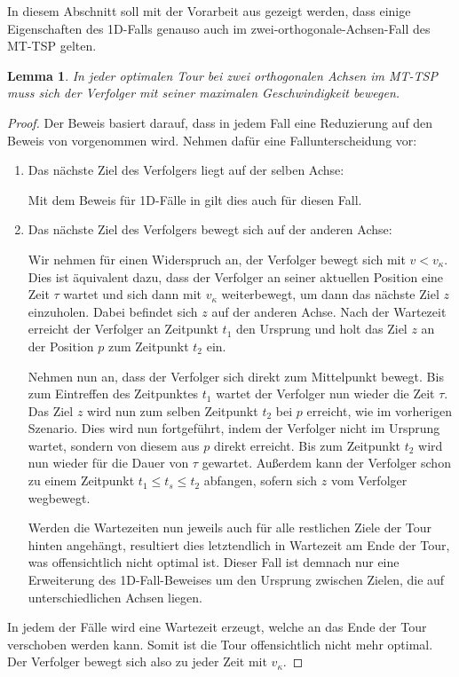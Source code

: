 \documentclass[german,version-2019-11]{uzl-thesis}
\newtheorem{lem}{Lemma}
\begin{document}
In diesem Abschnitt soll mit der Vorarbeit aus \cite{helvig} gezeigt werden, dass einige Eigenschaften des 1D-Falls genauso auch im zwei-orthogonale-Achsen-Fall des MT-TSP gelten.

\begin{lem}
\label{lem:1}
In jeder optimalen Tour bei zwei orthogonalen Achsen im MT-TSP muss sich der Verfolger mit seiner  maximalen Geschwindigkeit bewegen.
\end{lem}
 
\begin{proof}
Der Beweis basiert darauf, dass in jedem Fall eine Reduzierung auf den Beweis von \cite{helvig} vorgenommen wird. Nehmen dafür eine Fallunterscheidung vor:
\begin{enumerate}
\item Das nächste Ziel des Verfolgers liegt auf der selben Achse:

Mit dem Beweis für 1D-Fälle in \cite{helvig} gilt dies auch für diesen Fall.\\

\item Das nächste Ziel des Verfolgers bewegt sich auf der anderen Achse: 

Wir nehmen für einen Widerspruch an, der Verfolger bewegt sich mit $v < v_{\kappa}$. Dies ist äquivalent dazu, dass der Verfolger an seiner aktuellen Position eine Zeit $\tau$ wartet und sich dann mit $v_{\kappa}$ weiterbewegt, um dann das nächste Ziel $z$ einzuholen. Dabei befindet sich $z$ auf der anderen Achse. Nach der Wartezeit erreicht der Verfolger an Zeitpunkt $t_1$ den Ursprung und holt das Ziel $z$ an der Position $p$ zum Zeitpunkt $t_2$ ein. 

Nehmen nun an, dass der Verfolger sich direkt zum Mittelpunkt bewegt. Bis zum Eintreffen des Zeitpunktes $t_1$ wartet der Verfolger nun wieder die Zeit $\tau$. Das Ziel $z$ wird nun zum selben Zeitpunkt $t_2$ bei $p$ erreicht, wie im vorherigen Szenario. Dies wird nun fortgeführt, indem der Verfolger nicht im Ursprung wartet, sondern von diesem aus $p$ direkt erreicht. Bis zum Zeitpunkt $t_2$ wird nun wieder für die Dauer von $\tau$ gewartet. Außerdem kann der Verfolger schon zu einem Zeitpunkt $t_1 \leq t_{s} \leq t_2$ abfangen, sofern sich $z$ vom Verfolger wegbewegt. 

Werden die Wartezeiten nun jeweils auch für alle restlichen Ziele der Tour hinten angehängt, resultiert dies letztendlich in Wartezeit am Ende der Tour, was offensichtlich nicht optimal ist. Dieser Fall ist demnach nur eine Erweiterung des 1D-Fall-Beweises um den Ursprung zwischen Zielen, die auf unterschiedlichen Achsen liegen. 
\end{enumerate}
In jedem der Fälle wird eine Wartezeit erzeugt, welche an das Ende der Tour verschoben werden kann. Somit ist die Tour offensichtlich nicht mehr optimal. Der Verfolger bewegt sich also zu jeder Zeit mit $v_{\kappa}$.
\end{proof}
\end{document}
